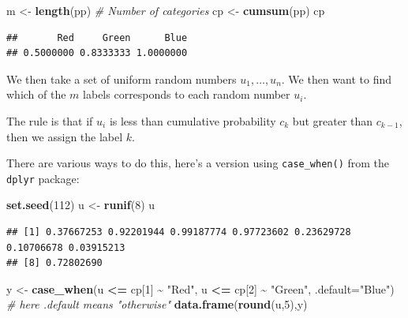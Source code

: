 \documentclass[
]{book}
\newenvironment{Shaded}{\begin{snugshade}}{\end{snugshade}}
\newcommand{\AttributeTok}[1]{\textcolor[rgb]{0.13,0.29,0.53}{#1}}
\newcommand{\CommentTok}[1]{\textcolor[rgb]{0.56,0.35,0.01}{\textit{#1}}}
\newcommand{\DecValTok}[1]{\textcolor[rgb]{0.00,0.00,0.81}{#1}}
\newcommand{\FunctionTok}[1]{\textcolor[rgb]{0.13,0.29,0.53}{\textbf{#1}}}
\newcommand{\NormalTok}[1]{#1}
\newcommand{\OtherTok}[1]{\textcolor[rgb]{0.56,0.35,0.01}{#1}}
\newcommand{\SpecialCharTok}[1]{\textcolor[rgb]{0.81,0.36,0.00}{\textbf{#1}}}
\newcommand{\StringTok}[1]{\textcolor[rgb]{0.31,0.60,0.02}{#1}}
\begin{document}
\begin{Shaded}
\begin{Highlighting}[]
\NormalTok{m }\OtherTok{\textless{}{-}} \FunctionTok{length}\NormalTok{(pp) }\CommentTok{\# Number of categories}
\NormalTok{cp }\OtherTok{\textless{}{-}} \FunctionTok{cumsum}\NormalTok{(pp)}
\NormalTok{cp}
\end{Highlighting}
\end{Shaded}

\begin{verbatim}
##       Red     Green      Blue 
## 0.5000000 0.8333333 1.0000000
\end{verbatim}

We then take a set of uniform random numbers \(u_1,\ldots,u_n\). We then
want to find which of the \(m\) labels corresponds to each random number \(u_i\).

The rule is that if \(u_i\) is less than cumulative probability \(c_k\) but
greater than \(c_{k-1}\), then we assign the label \(k\).

There are various ways to do this, here's a version using \texttt{case\_when()} from
the \texttt{dplyr} package:

\begin{Shaded}
\begin{Highlighting}[]
\FunctionTok{set.seed}\NormalTok{(}\DecValTok{112}\NormalTok{)}
\NormalTok{u }\OtherTok{\textless{}{-}} \FunctionTok{runif}\NormalTok{(}\DecValTok{8}\NormalTok{)}
\NormalTok{u}
\end{Highlighting}
\end{Shaded}

\begin{verbatim}
## [1] 0.37667253 0.92201944 0.99187774 0.97723602 0.23629728 0.10706678 0.03915213
## [8] 0.72802690
\end{verbatim}

\begin{Shaded}
\begin{Highlighting}[]
\NormalTok{y }\OtherTok{\textless{}{-}} \FunctionTok{case\_when}\NormalTok{(u }\SpecialCharTok{\textless{}=}\NormalTok{ cp[}\DecValTok{1}\NormalTok{] }\SpecialCharTok{\textasciitilde{}} \StringTok{"Red"}\NormalTok{,}
\NormalTok{               u }\SpecialCharTok{\textless{}=}\NormalTok{ cp[}\DecValTok{2}\NormalTok{] }\SpecialCharTok{\textasciitilde{}} \StringTok{"Green"}\NormalTok{,}
               \AttributeTok{.default=}\StringTok{"Blue"}\NormalTok{)   }\CommentTok{\# here .default means "otherwise"}
\FunctionTok{data.frame}\NormalTok{(}\FunctionTok{round}\NormalTok{(u,}\DecValTok{5}\NormalTok{),y)}
\end{Highlighting}
\end{Shaded}
\end{document}
